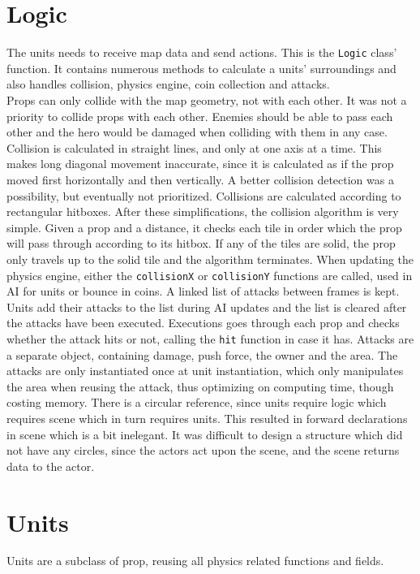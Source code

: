 \section{Logic} %
The units needs to receive map data and send actions. This is the {\tt Logic} class' function. It contains numerous methods to calculate a units' surroundings and also handles collision, physics engine, coin collection and attacks.\\
Props can only collide with the map geometry, not with each other. It was not a priority to collide props with each other. Enemies should be able to pass each other and the hero would be damaged when colliding with them in any case. Collision is calculated in straight lines, and only at one axis at a time. This makes long diagonal movement inaccurate, since it is calculated as if the prop moved first horizontally and then vertically. A better collision detection was a possibility, but eventually not prioritized. Collisions are calculated according to rectangular hitboxes.
\newline
After these simplifications, the collision algorithm is very simple. Given a prop and a distance, it checks each tile in order which the prop will pass through according to its hitbox. If any of the tiles are solid, the prop only travels up to the solid tile and the algorithm terminates. When updating the physics engine, either the {\tt collisionX} or {\tt collisionY} functions are called, used in AI for units or bounce in coins.
\newline
A linked list of attacks between frames is kept. Units add their attacks to the list during AI updates and the list is cleared after the attacks have been executed. Executions goes through each prop and checks whether the attack hits or not, calling the {\tt hit} function in case it has. Attacks are a separate object, containing damage, push force, the owner and the area. The attacks are only instantiated once at unit instantiation, which only manipulates the area when reusing the attack, thus optimizing on computing time, though costing memory.
\newline
There is a circular reference, since units require logic which requires scene which in turn requires units. This resulted in forward declarations in scene which is a bit inelegant. It was difficult to design a structure which did not have any circles, since the actors act upon the scene, and the scene returns data to the actor.

\section{Units}
Units are a subclass of prop, reusing all physics related functions and fields.

